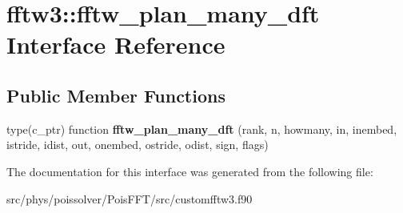 \hypertarget{interfacefftw3_1_1fftw__plan__many__dft}{}\section{fftw3\+:\+:fftw\+\_\+plan\+\_\+many\+\_\+dft Interface Reference}
\label{interfacefftw3_1_1fftw__plan__many__dft}
\subsection*{Public Member Functions}
\begin{DoxyCompactItemize}
\item 
type(c\+\_\+ptr) function {\bfseries fftw\+\_\+plan\+\_\+many\+\_\+dft} (rank, n, howmany, in, inembed, istride, idist, out, onembed, ostride, odist, sign, flags)\hypertarget{interfacefftw3_1_1fftw__plan__many__dft_a95adca20e352055f785c63cd8a8e0cc6}{}\label{interfacefftw3_1_1fftw__plan__many__dft_a95adca20e352055f785c63cd8a8e0cc6}

\end{DoxyCompactItemize}


The documentation for this interface was generated from the following file\+:\begin{DoxyCompactItemize}
\item 
src/phys/poissolver/\+Pois\+F\+F\+T/src/customfftw3.\+f90\end{DoxyCompactItemize}
